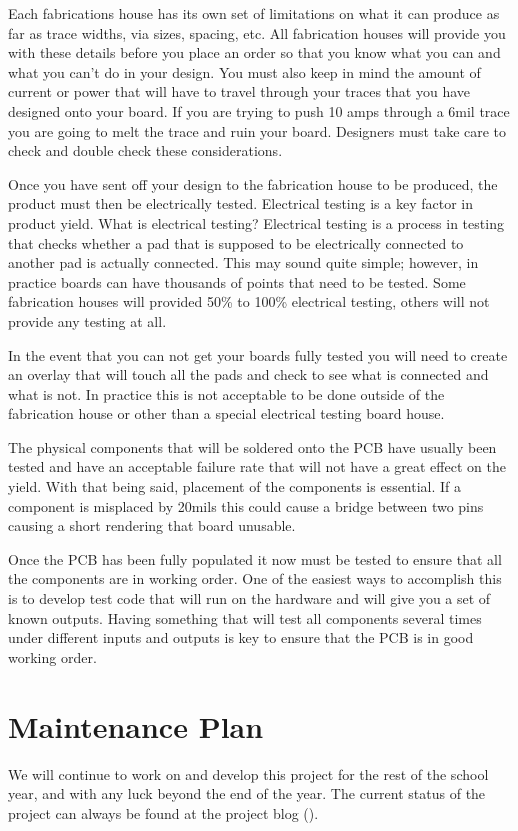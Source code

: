 \documentclass{article}
\numberwithin{equation}{section} %
\begin{document}
Each fabrications house has its own set of limitations on what it can produce as far as trace widths, via sizes, spacing, etc. All fabrication houses will provide you with these details before you place an order so that you know what you can and what you can't do in your design. You must also keep in mind the amount of current  or power that will have to travel through your traces that you have designed onto your board. If you are trying to push 10 amps through a 6mil trace you are going to melt the trace and ruin your board. Designers must take care to check and double check these considerations. 

Once you have sent off your design to the fabrication house to be produced, the product must then be electrically tested. Electrical testing is a key factor in product yield. What is electrical testing? Electrical testing is a process in testing that checks whether a pad that is supposed to be electrically connected to another pad is actually connected. This may sound quite simple; however, in practice boards can have thousands of points that need to be tested. Some fabrication houses will provided 50\% to 100\% electrical testing, others will not provide any testing at all. 

In the event that you can not get your boards fully tested you will need to create an overlay that will touch all the pads and check to see what is connected and what is not. In practice this is not acceptable to be done outside of the fabrication house or other than a special electrical testing board house.

The physical components that will be soldered onto the PCB have usually been tested and have an acceptable failure rate that will not have a great effect on the yield. With that being said, placement of the components is essential. If a component is misplaced by 20mils this could cause a bridge between two pins causing a short rendering that board unusable.

Once the PCB has been fully populated it now must be tested to ensure that all the components are in working order. One of the easiest ways to accomplish this is to develop test code that will run on the hardware and will give you a set of known outputs. Having something that will test all components several times under different inputs and outputs is key to ensure that the PCB is in good working order.

\section{Maintenance Plan}
We will continue to work on and develop this project for the rest of the school year, and with any luck beyond the end of the year. The current status of the project can always be found at the project blog (\cite{anzhelka_blog}).
\end{document}
